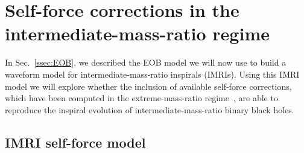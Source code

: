 %  
% 
%  
%  
 
  
 \section{Self-force corrections in the intermediate-mass-ratio regime}
 \label{s2}
 
 In Sec.~\ref{ssec:EOB}, we described the EOB model we will now use to build a waveform model for intermediate-mass-ratio inspirals (IMRIs). Using this IMRI model we will explore whether the inclusion of available self-force corrections, which have been computed in the extreme-mass-ratio regime~\cite{baracknewphi,sago,inner}, are able to reproduce the inspiral evolution of intermediate-mass-ratio binary black holes. 
 
 
 \subsection{IMRI self-force model}
 
